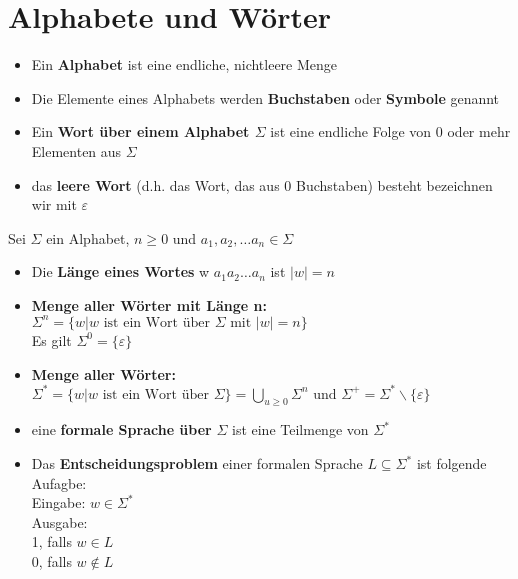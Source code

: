 \documentclass[14pt]{article}
\begin{document}
    \section{Alphabete und Wörter}
        \begin{definition}
            \begin{itemize}
                \item Ein \textbf{Alphabet} ist eine endliche, nichtleere Menge
                \item Die Elemente eines Alphabets werden \textbf{Buchstaben}
                oder \textbf{Symbole} genannt
                \item Ein \textbf{Wort über einem Alphabet $\varSigma$} ist eine
                endliche Folge von 0 oder mehr Elementen aus $\varSigma$
                \item das \textbf{leere Wort} (d.h. das Wort, das aus 0 Buchstaben)
                besteht bezeichnen wir mit $\varepsilon$ 
            \end{itemize}
        \end{definition}
        \begin{definition}
            Sei $\varSigma$ ein Alphabet, $n \geq 0$ und $a_1, a_2, \dots a_n 
            \in \varSigma$
            \begin{itemize}
                \item Die \textbf{Länge eines Wortes} w $a_1a_2\dots a_n$ ist 
                $|w| = n$
                \item \textbf{Menge aller Wörter mit Länge n:} \\
                $\varSigma^n = \{ w | w \text{ ist ein Wort über $\varSigma$ 
                mit $|w| = n$} \}$ \\
                Es gilt $\varSigma^0 = \{ \varepsilon \}$
                \item \textbf{Menge aller Wörter:} \\
                $\varSigma^* = \{ w | w \text{ ist ein Wort über $\varSigma$}\}
                = \bigcup_{u\geq 0} \varSigma^n \text{ und } \varSigma^+ 
                = \varSigma^* \backslash \{ \varepsilon \} $
                \item eine \textbf{formale Sprache über} $\varSigma$ ist 
                eine Teilmenge von $\varSigma^*$ 
                \item Das \textbf{Entscheidungsproblem} einer formalen Sprache
                $L \subseteq \varSigma^*$ ist folgende Aufagbe: \\
                Eingabe: $w \in \varSigma^*$ \\
                Ausgabe: \\
                1, falls $w \in L$ \\
                0, falls $w \notin L$
            \end{itemize}
        \end{definition}
\end{document}
